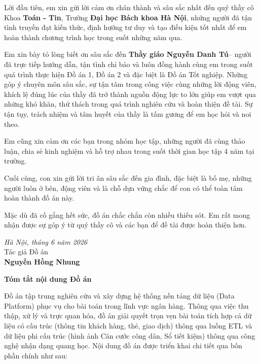 \documentclass[oneside, a4paper]{book}
\theoremstyle{plain}
\theoremstyle{definition}
\theoremstyle{remark}
\begin{document}
Lời đầu tiên, em xin gửi lời cảm ơn chân thành và sâu sắc nhất đến quý thầy cô Khoa \textbf{Toán - Tin}, Trường \textbf{Đại học Bách khoa Hà Nội}, những người đã tận tình truyền đạt kiến thức, định hướng tư duy và tạo điều kiện tốt nhất để em hoàn thành chương trình học trong suốt những năm qua.

Em xin bày tỏ lòng biết ơn sâu sắc đến \textbf{Thầy giáo Nguyễn Danh Tú}– người đã trực tiếp hướng dẫn, tận tình chỉ bảo và luôn đồng hành cùng em trong suốt quá trình thực hiện Đồ án 1, Đồ án 2 và đặc biệt là Đồ án Tốt nghiệp. Những góp ý chuyên môn sâu sắc, sự tận tâm trong công việc cùng những lời động viên, khích lệ đúng lúc của thầy đã trở thành nguồn động lực to lớn giúp em vượt qua những khó khăn, thử thách trong quá trình nghiên cứu và hoàn thiện đề tài. Sự tận tụy, trách nhiệm và tâm huyết của thầy là tấm gương để em học hỏi và noi theo.


Em cũng xin cảm ơn các bạn trong nhóm học tập, những người đã cùng thảo luận, chia sẻ kinh nghiệm và hỗ trợ nhau trong suốt thời gian học tập 4 năm tại trường.

Cuối cùng, con xin gửi lời tri ân sâu sắc đến gia đình, đặc biệt là bố mẹ, những người luôn ở bên, động viên và là chỗ dựa vững chắc để con có thể toàn tâm hoàn thành đồ án này.

Mặc dù đã cố gắng hết sức, đồ án chắc chắn còn nhiều thiếu sót. Em rất mong nhận được sự góp ý từ quý thầy cô và các bạn để đề tài được hoàn thiện hơn.

\vspace{1cm}

\begin{minipage}{0.5\textwidth}
\end{minipage}
\hspace{0.5\textwidth}
\begin{minipage}{0.5\textwidth}
    \begin{center}
        \textit{Hà Nội, tháng 6 năm 2026} \\
        Tác giả Đồ án \\
        \vspace{2cm}
        \textbf{Nguyễn Hồng Nhung}
    \end{center}
\end{minipage}

\newpage
\fontsize{22pt}{16pt}\selectfont
{\bfseries Tóm tắt nội dung Đồ án}
\fontsize{13pt}{16pt}\selectfont
\bigskip
\bigskip

Đồ án tập trung nghiên cứu và xây dựng hệ thống nền tảng dữ liệu (Data Platform) phục vụ cho bài toán trong lĩnh vực ngân hàng. Thông qua việc thu thập, xử lý và trực quan hóa, đồ án giải quyết trọn vẹn bài toán tích hợp cả dữ liệu có cấu trúc (thông tin khách hàng, thẻ, giao dịch) thông qua luồng ETL và dữ liệu phi cấu trúc (hình ảnh Căn cước công dân, Sổ tiết kiệm) thông qua công nghệ nhận dạng quang học. Nội dung đồ án được triển khai chi tiết qua bốn phần chính như sau:
\end{document}
